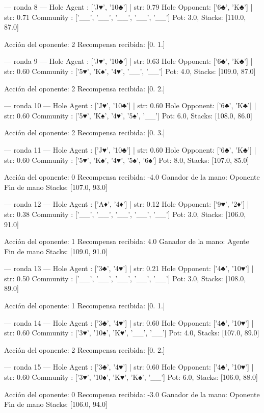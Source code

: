 --- ronda 8 ---
Hole Agent : ['J♥', '10♣'] | str: 0.79
Hole Opponent: ['6♣', 'K♣'] | str: 0.71
Community  : ['__', '__', '__', '__', '__']
Pot: 3.0, Stacks: [110.0, 87.0]

Acción del oponente: 2
Recompensa recibida: [0. 1.]

--- ronda 9 ---
Hole Agent : ['J♥', '10♣'] | str: 0.63
Hole Opponent: ['6♣', 'K♣'] | str: 0.60
Community  : ['5♥', 'K♠', '4♥', '__', '__']
Pot: 4.0, Stacks: [109.0, 87.0]

Acción del oponente: 2
Recompensa recibida: [0. 2.]

--- ronda 10 ---
Hole Agent : ['J♥', '10♣'] | str: 0.60
Hole Opponent: ['6♣', 'K♣'] | str: 0.60
Community  : ['5♥', 'K♠', '4♥', '5♠', '__']
Pot: 6.0, Stacks: [108.0, 86.0]

Acción del oponente: 2
Recompensa recibida: [0. 3.]

--- ronda 11 ---
Hole Agent : ['J♥', '10♣'] | str: 0.60
Hole Opponent: ['6♣', 'K♣'] | str: 0.60
Community  : ['5♥', 'K♠', '4♥', '5♠', '6♠']
Pot: 8.0, Stacks: [107.0, 85.0]

Acción del oponente: 0
Recompensa recibida: -4.0
Ganador de la mano: Oponente
Fin de mano Stacks: [107.0, 93.0]


--- ronda 12 ---
Hole Agent : ['A♦', '4♦'] | str: 0.12
Hole Opponent: ['9♥', '2♦'] | str: 0.38
Community  : ['__', '__', '__', '__', '__']
Pot: 3.0, Stacks: [106.0, 91.0]

Acción del oponente: 1
Recompensa recibida: 4.0
Ganador de la mano: Agente
Fin de mano Stacks: [109.0, 91.0]


--- ronda 13 ---
Hole Agent : ['3♣', '4♥'] | str: 0.21
Hole Opponent: ['4♣', '10♥'] | str: 0.50
Community  : ['__', '__', '__', '__', '__']
Pot: 3.0, Stacks: [108.0, 89.0]

Acción del oponente: 1
Recompensa recibida: [0. 1.]

--- ronda 14 ---
Hole Agent : ['3♣', '4♥'] | str: 0.60
Hole Opponent: ['4♣', '10♥'] | str: 0.60
Community  : ['3♥', '10♠', 'K♥', '__', '__']
Pot: 4.0, Stacks: [107.0, 89.0]

Acción del oponente: 2
Recompensa recibida: [0. 2.]

--- ronda 15 ---
Hole Agent : ['3♣', '4♥'] | str: 0.60
Hole Opponent: ['4♣', '10♥'] | str: 0.60
Community  : ['3♥', '10♠', 'K♥', 'K♠', '__']
Pot: 6.0, Stacks: [106.0, 88.0]

Acción del oponente: 0
Recompensa recibida: -3.0
Ganador de la mano: Oponente
Fin de mano Stacks: [106.0, 94.0]


